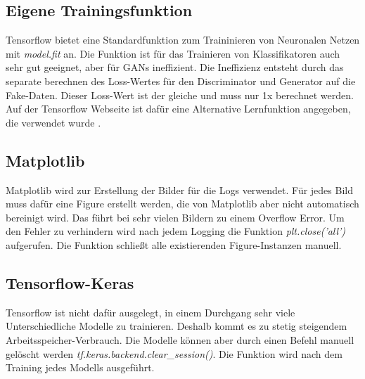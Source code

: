 \subsection{Eigene Trainingsfunktion}
Tensorflow bietet eine Standardfunktion zum Traininieren von Neuronalen Netzen mit \textit{model.fit} an.
Die Funktion ist für das Trainieren von Klassifikatoren auch sehr gut geeignet, aber für GANs ineffizient.
Die Ineffizienz entsteht durch das separate berechnen des Loss-Wertes für den Discriminator und Generator auf die Fake-Daten.
Dieser Loss-Wert ist der gleiche und muss nur 1x berechnet werden.
Auf der Tensorflow Webseite ist dafür eine Alternative Lernfunktion angegeben, die verwendet wurde \cite{tensorflow-gan-learn-step}.

\subsection{Matplotlib}
Matplotlib wird zur Erstellung der Bilder für die Logs verwendet.
Für jedes Bild muss dafür eine Figure erstellt werden, die von Matplotlib aber nicht automatisch bereinigt wird.
Das führt bei sehr vielen Bildern zu einem Overflow Error.
Um den Fehler zu verhindern wird nach jedem Logging die Funktion \textit{plt.close('all')} aufgerufen.
Die Funktion schließt alle existierenden Figure-Instanzen manuell.

\subsection{Tensorflow-Keras}
Tensorflow ist nicht dafür ausgelegt, in einem Durchgang sehr viele Unterschiedliche Modelle zu trainieren.
Deshalb kommt es zu stetig steigendem Arbeitsspeicher-Verbrauch.
Die Modelle können aber durch einen Befehl manuell gelöscht werden \textit{tf.keras.backend.clear\_session()}.
Die Funktion wird nach dem Training jedes Modells ausgeführt.
